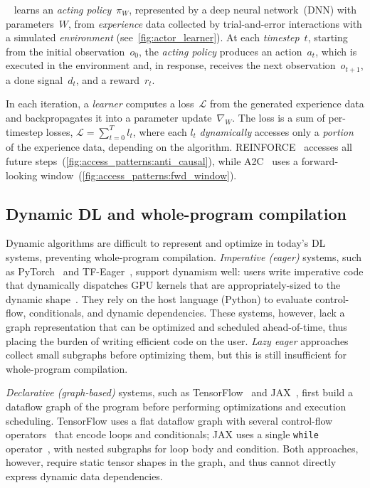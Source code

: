 ~\cite{sutton2018reinforcement} learns an \emph{acting policy}~$\pi_{W}$, represented by a deep neural network~(DNN) with parameters~$W$, from \emph{experience} data collected by trial-and-error interactions with a simulated \emph{environment} (see~\F\ref{fig:actor_learner}).
At each \emph{timestep}~$t$, starting from the initial observation~$o_0$, the \emph{acting policy} produces an action~$a_t$, which is executed in the environment and, in response, receives the next observation~$o_{t+1}$, a done signal~$d_{t}$, and a reward~$r_{t}$.  


In each iteration, a \emph{learner} computes a loss~$\mathcal{L}$ from the generated experience data and backpropagates it into a parameter update~$\nabla_W$. 
The loss is a sum of per-timestep losses, $\mathcal{L} = \sum_{t=0}^T l_{t}$,
where each $l_{t}$ \emph{dynamically} accesses only a \emph{portion} of the experience data, depending on the algorithm. 
REINFORCE~\cite{williams1992simple} accesses all future steps~(\F\ref{fig:access_patterns:anti_causal}), while A2C~\cite{mnih2016asynchronous} uses a forward-looking window~(\F\ref{fig:access_patterns:fwd_window}).



\subsection{Dynamic DL and whole-program compilation}
\label{sec:dataflow}

Dynamic algorithms are difficult to represent and optimize in today's DL systems, preventing whole-program compilation.
\emph{Imperative (eager)} systems, such as PyTorch~\cite{paszke2019pytorch} and TF-Eager~\cite{agrawal2019tensorflow}, support dynamism well: users write imperative code that dynamically dispatches GPU kernels that are appropriately-sized to the dynamic shape~\cite{chetlur2014cudnn}. 
They rely on the host language (\eg Python) to evaluate control-flow, conditionals, and dynamic dependencies. 
These systems, however, lack a graph representation that can be optimized and scheduled ahead-of-time, thus placing the burden of writing efficient code on the user. \emph{Lazy eager} approaches~\cite{suhan2021lazytensor} collect small subgraphs before optimizing them, but this is still insufficient for whole-program compilation. 

\emph{Declarative (graph-based)} systems, such as TensorFlow~\cite{abadi2016tensorflow} and JAX~\cite{frostig2018compiling}, first build a dataflow graph of the program before performing optimizations and execution scheduling. TensorFlow uses a flat dataflow graph with several control-flow operators~\cite{yu2018dynamic} that encode loops and conditionals; JAX uses a single \texttt{while} operator~\cite{xla_op_semantics}, with nested subgraphs for loop body and condition. Both approaches, however, require static tensor shapes in the graph, and thus cannot directly express dynamic data dependencies.

